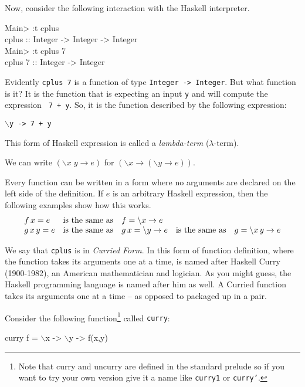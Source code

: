 \documentclass[11pt]{article}
\begin{document}
Now, consider the following interaction with the Haskell interpreter.
\begin{program*}
  \> Main> :t cplus    \\
  \> cplus :: Integer -> Integer -> Integer    \\
  \> Main> :t cplus 7    \\
  \> cplus 7 :: Integer -> Integer    \\
\end{program*}
Evidently {\tt{cplus 7}} is a function of type {\tt{Integer -> Integer}}.  But
what function is it?  It is the function that is expecting an input {\tt{y}}
and will compute the expression {\tt{ 7 + y}}.  So, it is the function
described by the following expression:\\ \begin{center}{\tt{$\backslash$y -> 7
+ y}} \end{center} This form of Haskell expression is called a
{\em{lambda-term}} ($\lambda$-term).

We can write $(\backslash x \; y \rightarrow e)$  for  $(\backslash x \rightarrow (\backslash y \rightarrow e))$.

Every function can be written in a form where no arguments are declared on the
left side of the definition.  If $e$ is an arbitrary Haskell expression, then
the following examples show how this works.
\[\begin{array}{lclcl}
f\, x = e & {\rm{is\ the\ same\ as }} & f = \backslash{}x \rightarrow e \\
g \, x \, y = e & {\rm{is\ the\ same\ as }} & g \, x = \backslash{}y \rightarrow e & {\rm{is\ the\ same\ as }} & g = \backslash{}x\, y \rightarrow e \\
\end{array}\]


We say that {\tt{cplus}} is in {\em{Curried Form}}.  In this form of function
definition, where the function takes its arguments one at a time, is named
after Haskell Curry (1900-1982), an American mathematician and logician.  As
you might guess, the Haskell programming language is named after him as well.
A Curried function  takes its arguments one at a time -- as opposed to packaged up in a pair.


Consider the following function\footnote{Note that curry and uncurry are
defined in the standard prelude so if you want to try your own version give it
a name like {\tt{curry1}} or {\tt{curry'}}.} called {\tt{curry}}:
\begin{program*}
  \> curry f  =  $\backslash$x -> $\backslash$y -> f(x,y)
\end{program*}
\end{document}
